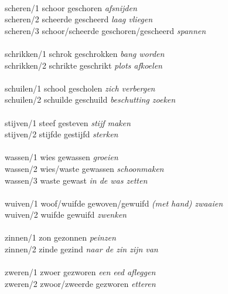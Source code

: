 \begin{tabbing}
           \>             \>              \>        \>          \\
scheren/1  \> schoor      \>  geschoren   \>  [7]   \> {\em afsnijden} \\
scheren/2  \> scheerde    \>  gescheerd   \>  [3]   \> {\em laag vliegen} \\
scheren/3  \> schoor/scheerde \> geschoren/gescheerd \>  [7,3] \> 
{\em spannen} \\
           \>             \>              \>        \>          \\
schrikken/1  \> schrok      \>  geschrokken \>  [7]   \> {\em bang worden} \\
schrikken/2  \> schrikte    \>  geschrikt   \>  [3]   \> {\em plots afkoelen} \\
           \>             \>              \>        \>          \\
schuilen/1 \> school      \>  gescholen   \>  [7]   \> {\em zich verbergen} \\
schuilen/2 \> schuilde    \>  geschuild   \>  [3]   \> 
{\em beschutting zoeken} \\
           \>             \>              \>        \>          \\
stijven/1  \> steef       \>  gesteven    \>  [7]   \> {\em stijf maken} \\
stijven/2  \> stijfde     \>  gestijfd    \>  [3]   \> {\em sterken} \\
           \>             \>              \>        \>          \\
wassen/1   \> wies        \>  gewassen    \>  [5]   \> {\em groeien} \\
wassen/2   \> wies/waste  \>  gewassen    \>  [5,15] \> {\em schoonmaken} \\
wassen/3   \> waste       \>  gewast      \>  [3]   \> {\em in de was zetten} \\
           \>             \>              \>        \>          \\
wuiven/1   \> woof/wuifde \>  gewoven/gewuifd \> [7,3] \> 
{\em (met hand) zwaaien} \\
wuiven/2   \> wuifde      \>  gewuifd     \>  [3]   \> {\em zwenken} \\
           \>             \>              \>        \>          \\
zinnen/1   \> zon         \>  gezonnen    \>  [7]   \> {\em peinzen} \\
zinnen/2   \> zinde       \>  gezind      \>  [3]   \> 
{\em naar de zin zijn van} \\ 
           \>             \>              \>        \>          \\
zweren/1   \> zwoer       \>  gezworen    \>  [11]  \> {\em een eed afleggen} \\
zweren/2   \> zwoor/zweerde \>  gezworen  \>  [7,15] \> {\em etteren}         \\
\end{tabbing}

